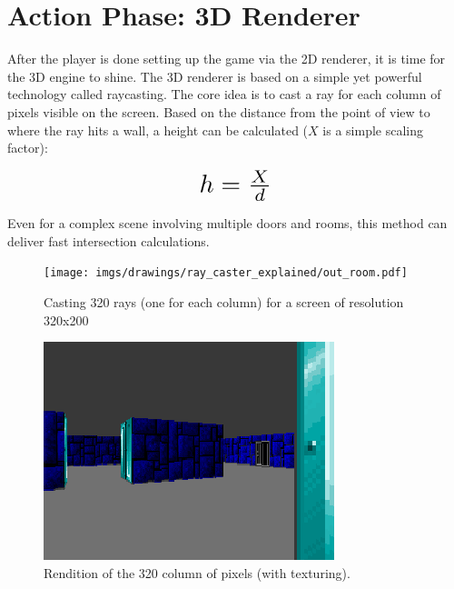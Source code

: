 \section{Action Phase: 3D Renderer}
After the player is done setting up the game via the 2D renderer, it is time for the 3D engine to shine. The 3D renderer is based on a simple yet powerful technology called raycasting. The core idea is to cast a ray for each column of pixels visible on the screen. Based on the distance  from the point of view to where the ray hits a wall, a height  can be calculated ($X$ is a simple scaling factor):\\
\par
\begin{figure}[H]
  \centering
  \begin{equation*}
      \scalebox{2.0}{$h = \frac{X}{d}$} 
  \end{equation*}
\end{figure}
\par
Even for a complex scene involving multiple doors and rooms, this method can deliver fast intersection calculations.
\par
\begin{figure}[H]
\centering
 \texttt{[image: imgs/drawings/ray\_caster\_explained/out\_room.pdf]}
 \caption{Casting 320 rays (one for each column) for a screen of resolution 320x200} \label{fig:Raycasting2}
\end{figure}

\begin{figure}[H]
  \centering
 \includegraphics[width=\textwidth]{imgs/drawings/ray_caster_explained/out_door.png}
 \caption{Rendition of the 320 column of pixels (with texturing).} 
\end{figure} 















